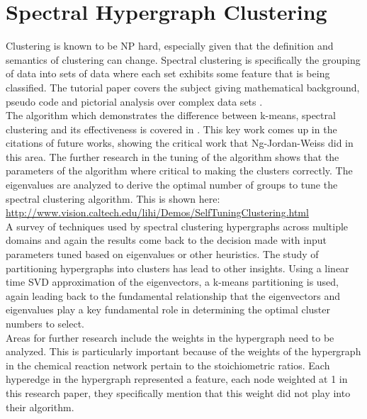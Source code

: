 \documentclass[10pt]{article}
\begin{document}
\section{Spectral Hypergraph Clustering}

Clustering is known to be NP hard, especially given that the definition and semantics of clustering can change. Spectral clustering is specifically the grouping of data into sets of data where each set exhibits some feature that is being classified. The tutorial paper covers the subject giving mathematical background, pseudo code and pictorial analysis over complex data sets \cite{INTRO}. \\

The algorithm which demonstrates the difference between k-means, spectral clustering and its effectiveness is covered in \cite{ALGORYTM}. This key work comes up in the citations of future works, showing the critical work that Ng-Jordan-Weiss did in this area. The further research in the tuning of the algorithm \cite{TUNING} shows that the parameters of the algorithm where critical to making the clusters correctly. The eigenvalues are analyzed to derive the optimal number of groups to tune the spectral clustering algorithm.  This is shown here:  \url{http://www.vision.caltech.edu/lihi/Demos/SelfTuningClustering.html}\\

A survey of techniques used by spectral clustering hypergraphs across multiple domains and again the results come back to the decision made with input parameters tuned based on eigenvalues or other heuristics\cite{samples}. The study of partitioning hypergraphs into clusters has lead to other insights. Using a linear time SVD approximation of the eigenvectors, a k-means partitioning is used, again leading back to the fundamental relationship that the eigenvectors and eigenvalues play a key fundamental role in determining the optimal cluster numbers to select. \\ 

Areas for further research include the weights in the hypergraph \cite{LEARNING} need to be analyzed. This is particularly important because of the weights of the hypergraph in the chemical reaction network pertain to the stoichiometric ratios. Each hyperedge in the hypergraph represented a feature, each node weighted at 1 in this research paper, they specifically mention that this weight did not play into their algorithm. \\




\newpage
	
\nocite{*}


\end{document}
